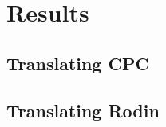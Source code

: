 \documentclass[lualatex, compress, 12pt, handout]{beamer}
\begin{document}
\section{Results}

\subsection{Translating CPC}

\subsection{Translating Rodin}










\end{document}
